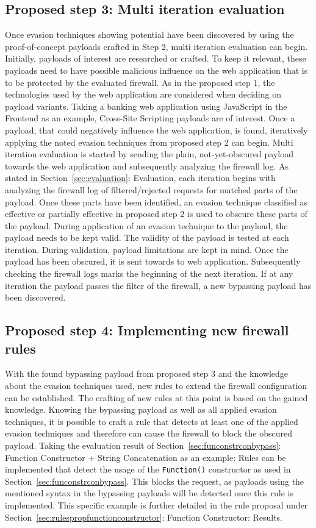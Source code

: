 \subsection{Proposed step 3: Multi iteration evaluation}
\label{sec:genericproposalstep3}
Once evasion techniques showing potential have been discovered by using the proof-of-concept payloads crafted in Step 2, multi iteration evaluation can begin. Initially, payloads of interest are researched or crafted. To keep it relevant, these payloads need to have possible malicious influence on the web application that is to be protected by the evaluated firewall. As in the proposed step 1, the technologies used by the web application are considered when deciding on payload variants. 
Taking a banking web application using JavaScript in the Frontend as an example, Cross-Site Scripting payloads are of interest. Once a payload, that could negatively influence the web application, is found, iteratively applying the noted evasion techniques from proposed step 2 can begin.
Multi iteration evaluation is started by sending the plain, not-yet-obscured payload towards the web application and subsequently analyzing the firewall log. As stated in Section~\ref{sec:evaluation}: Evaluation, each iteration begins with analyzing the firewall log of filtered/rejected requests for matched parts of the payload. Once these parts have been identified, an evasion technique classified as effective or partially effective in proposed step 2 is used to obscure these parts of the payload.
During application of an evasion technique to the payload, the payload needs to be kept valid. The validity of the payload is tested at each iteration. During validation, payload limitations are kept in mind.
Once the payload has been obscured, it is sent towards to web application. Subsequently checking the firewall logs marks the beginning of the next iteration. If at any iteration the payload passes the filter of the firewall, a new bypassing payload has been discovered.

\subsection{Proposed step 4: Implementing new firewall rules}
With the found bypassing payload from proposed step 3 and the knowledge about the evasion techniques used, new rules to extend the firewall configuration can be established. The crafting of new rules at this point is based on the gained knowledge. Knowing the bypassing payload as well as all applied evasion techniques, it is possible to craft a rule that detects at least one of the applied evasion techniques and therefore can cause the firewall to block the obscured payload. 
Taking the evaluation result of Section~\ref{sec:funconstrconbypass}: Function Constructor + String Concatenation as an example: Rules can be implemented that detect the usage of the \verb|Function()| constructor as used in Section~\ref{sec:funconstrconbypass}. This blocks the request, as payloads using the mentioned syntax in the bypassing payloads will be detected once this rule is implemented. This specific example is further detailed in the rule proposal under Section~\ref{sec:rulespropfunctionconstructor}: Function Constructor: Results.

